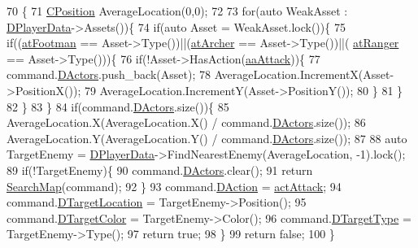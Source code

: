 \begin{DoxyCode}
70                                                            \{
71     \hyperlink{classCPosition}{CPosition} AverageLocation(0,0);
72     
73     \textcolor{keywordflow}{for}(\textcolor{keyword}{auto} WeakAsset : \hyperlink{classCAIPlayer_a83b5113c8f7e80df54940b647c5ee2e6}{DPlayerData}->Assets())\{
74         \textcolor{keywordflow}{if}(\textcolor{keyword}{auto} Asset = WeakAsset.lock())\{
75             \textcolor{keywordflow}{if}((\hyperlink{GameDataTypes_8h_a5600d4fc433b83300308921974477fecad586e8ff9ee846d22630c2066e8fb7c2}{atFootman} == Asset->Type())||(\hyperlink{GameDataTypes_8h_a5600d4fc433b83300308921974477feca7fad0074234068ff0af4092a75b929f8}{atArcher} == Asset->Type())||(
      \hyperlink{GameDataTypes_8h_a5600d4fc433b83300308921974477fecaafd2b1e0ca34872bb06098dbec9939e0}{atRanger} == Asset->Type()))\{
76                 \textcolor{keywordflow}{if}(!Asset->HasAction(\hyperlink{GameDataTypes_8h_ab47668e651a3032cfb9c40ea2d60d670a948eefd20b9e43d3b4cfcf613774716d}{aaAttack}))\{
77                     command.\hyperlink{structSPlayerCommandRequest_aa37fc01519676345703d78b9f573894a}{DActors}.push\_back(Asset);
78                     AverageLocation.IncrementX(Asset->PositionX());
79                     AverageLocation.IncrementY(Asset->PositionY());
80                 \}
81             \}
82         \}
83     \}
84     \textcolor{keywordflow}{if}(command.\hyperlink{structSPlayerCommandRequest_aa37fc01519676345703d78b9f573894a}{DActors}.size())\{
85         AverageLocation.X(AverageLocation.X() / command.\hyperlink{structSPlayerCommandRequest_aa37fc01519676345703d78b9f573894a}{DActors}.size());
86         AverageLocation.Y(AverageLocation.Y() / command.\hyperlink{structSPlayerCommandRequest_aa37fc01519676345703d78b9f573894a}{DActors}.size());
87         
88         \textcolor{keyword}{auto} TargetEnemy = \hyperlink{classCAIPlayer_a83b5113c8f7e80df54940b647c5ee2e6}{DPlayerData}->FindNearestEnemy(AverageLocation, -1).lock();
89         \textcolor{keywordflow}{if}(!TargetEnemy)\{
90             command.\hyperlink{structSPlayerCommandRequest_aa37fc01519676345703d78b9f573894a}{DActors}.clear();
91             \textcolor{keywordflow}{return} \hyperlink{classCAIPlayer_afafbe8fc589e09a16ae1f02f2794d7b0}{SearchMap}(command);
92         \}
93         command.\hyperlink{structSPlayerCommandRequest_a80897bbccf2c4e0b148a7aa815a926c6}{DAction} = \hyperlink{GameDataTypes_8h_a35b98ce26aca678b03c6f9f76e4778ceaf90bc0c36c70d816217d0d4b08b0ba4c}{actAttack};
94         command.\hyperlink{structSPlayerCommandRequest_a701702b94ca2fd2738e95ef6711dd41a}{DTargetLocation} = TargetEnemy->Position();
95         command.\hyperlink{structSPlayerCommandRequest_a3690a5117efe6214d92f18d672b5714f}{DTargetColor} = TargetEnemy->Color();
96         command.\hyperlink{structSPlayerCommandRequest_a864e47c641127665751091876a6d3c5e}{DTargetType} = TargetEnemy->Type(); 
97         \textcolor{keywordflow}{return} \textcolor{keyword}{true};
98     \}
99     \textcolor{keywordflow}{return} \textcolor{keyword}{false};    
100 \}
\end{DoxyCode}

